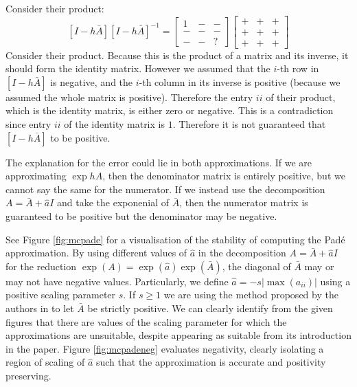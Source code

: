 Consider their product:
\begin{equation*}
    \left[I - h\bar{A}\right] \left[I - h\bar{A}\right]^{-1} = \begin{bmatrix}
        1 & - & - \\
        - & - & - \\
        - & - & ?
    \end{bmatrix} \begin{bmatrix}
        + & + & + \\
        + & + & + \\
        + & + & +
    \end{bmatrix}
\end{equation*}
Consider their product. Because this is the product of a matrix and its inverse, it should form the identity matrix.
However we assumed that the $i$-th row in $[I - h\bar{A}]$ is negative, and the $i$-th column in its inverse is positive (because we assumed the whole matrix is positive).
Therefore the entry $ii$ of their product, which is the identity matrix, is either zero or negative. This is a contradiction since entry $ii$ of the identity matrix is $1$.
Therefore it is not guaranteed that $[I - h\bar{A}]$ to be positive.

The explanation for the error could lie in both approximations. If we are approximating $\exp{hA}$, then the denominator matrix is entirely positive, but we cannot say the same for the numerator.
If we instead use the decomposition $A = \bar{A} + \hat{a}I$ and take the exponenial of $\bar{A}$, then the numerator matrix is guaranteed to be positive but the denominator may be negative.

See Figure \ref{fig:mcpade} for a visualisation of the stability of computing the Pad\'e approximation.
By using different values of $\hat{a}$ in the decomposition $A = \bar{A} + \hat{a}I$ for the reduction $\exp(A) = \exp(\hat{a})\exp(\bar{A})$,
the diagonal of $\bar{A}$ may or may not have negative values.
Particularly, we define $\hat{a}= -s |\max(a_{ii})|$ using a positive scaling parameter $s$.
If $s\ge 1$ we are using the method proposed by the authors in \cite{blanes_pos_2022} to let $\bar{A}$ be strictly positive. 
We can clearly identify from the given figures that there are values of the scaling parameter for which the approximations are unsuitable, despite appearing as suitable from its introduction in the paper.
Figure \ref{fig:mcpadeneg} evaluates negativity, clearly isolating a region of scaling of $\hat{a}$ such that the approximation is accurate and positivity preserving.

